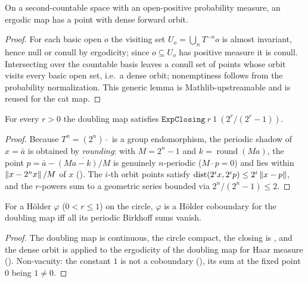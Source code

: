 \begin{theorem}\label{thm:livsic-ergodic-dense}
  \leanok
  On a second-countable space with an open-positive probability measure, an ergodic map has a point
  with dense forward orbit.
\end{theorem}
\begin{proof}\leanok
  For each basic open \(o\) the visiting set \(U_o = \bigcup_n T^{-n}o\) is almost invariant, hence
  null or conull by ergodicity; since \(o\subseteq U_o\) has positive measure it is conull.
  Intersecting over the countable basis leaves a conull set of points whose orbit visits every basic
  open set, i.e.\ a dense orbit; nonemptiness follows from the probability normalization. This
  generic lemma is Mathlib-upstreamable and is reused for the cat map.
\end{proof}

\begin{theorem}\label{thm:livsic-doubling-closing}
  \leanok
  For every \(r>0\) the doubling map satisfies \(\texttt{ExpClosing}\ r\ 1\ (2^{r}/(2^{r}-1))\).
\end{theorem}
\begin{proof}\leanok
  Because \(T^n = (2^n)\cdot\) is a group endomorphism, the periodic shadow of \(x = \bar a\) is
  obtained by \emph{rounding}: with \(M = 2^n - 1\) and \(k = \operatorname{round}(Ma)\), the point
  \(p = \bar a - \overline{(Ma-k)/M}\) is genuinely \(n\)-periodic (\(M\cdot p = 0\)) and lies within
  \(\left\lVert x - 2^n x \right\rVert/M\) of \(x\) (). The
  \(i\)-th orbit points satisfy \(\operatorname{dist}(2^i x, 2^i p)\le 2^i\left\lVert x-p \right\rVert\), and the \(r\)-powers sum to
  a geometric series bounded via \(2^n/(2^n-1)\le 2\).
\end{proof}

\begin{theorem}\label{thm:livsic-doubling}
  \leanok
  For a Hölder \(\varphi\) (\(0 < r\le 1\)) on the circle, \(\varphi\) is a Hölder coboundary for the
  doubling map iff all its periodic Birkhoff sums vanish.
\end{theorem}
\begin{proof}\leanok
  The doubling map is continuous, the circle compact, the closing is
  , and the dense orbit is  applied
  to the ergodicity of the doubling map for Haar measure
  (). Non-vacuity: the constant \(1\) is not
  a coboundary (), its sum at the fixed
  point \(0\) being \(1\ne 0\).
\end{proof}

